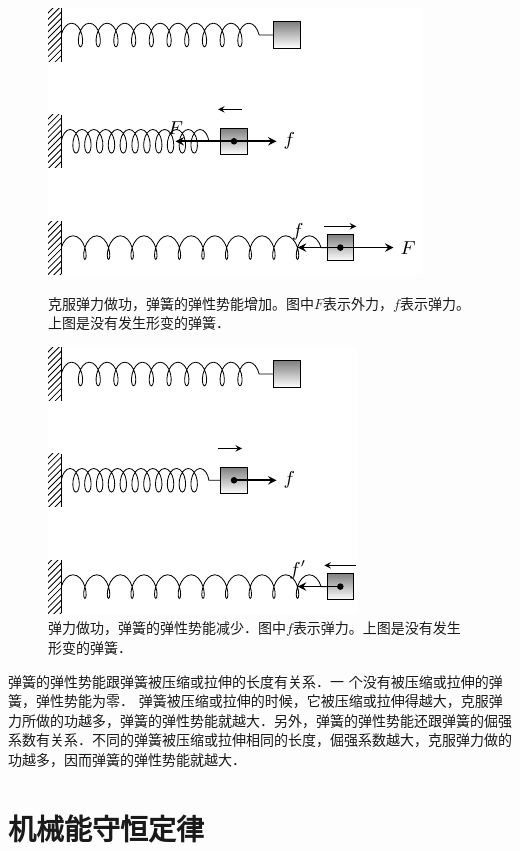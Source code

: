 \begin{figure}[htbp]
	\centering
	\begin{minipage}[t]{0.46\linewidth}
		\centering
		\includegraphics{fig/A/7-18.pdf}
		\caption{克服弹力做功，弹簧的弹性势能增加。图中$F$表示外力，$f$表示弹力。上图是没有发生形变的弹簧．}\label{fig_A_7-18}
	\end{minipage}
	\hfill
	\begin{minipage}[t]{0.42\linewidth}
		\centering
		\centering
		\includegraphics{fig/A/7-19.pdf}
		\caption{弹力做功，弹簧的弹性势能减少．图中$f$表示弹力。上图是没有发生形变的弹簧．}\label{fig_A_7-19}
	\end{minipage}
\end{figure}

弹簧的弹性势能跟弹簧被压缩或拉伸的长度有关系．一
个没有被压缩或拉伸的弹簧，弹性势能为零．
弹簧被压缩或拉伸的时候，它被压缩或拉伸得越大，克服弹力所做的功越多，弹簧的弹性势能就越大．另外，弹簧的弹性势能还跟弹簧的倔强系数有关系．不同的弹簧被压缩或拉伸相同的长度，倔强系数越大，克服弹力做的功越多，因而弹簧的弹性势能就越大．

\section{机械能守恒定律}

